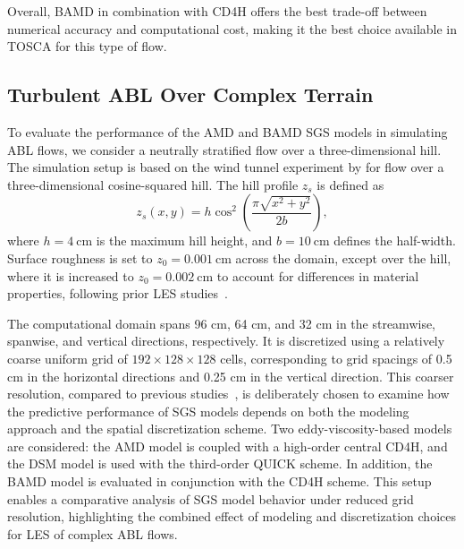 \documentclass[final,3p]{elsarticle}
\begin{document}
Overall, BAMD in combination with CD4H offers the best trade-off between numerical accuracy and computational cost, making it the best choice available in TOSCA for this type of flow.

\subsection{Turbulent ABL Over Complex Terrain}
To evaluate the performance of the AMD and BAMD SGS models in simulating ABL flows, we consider a neutrally stratified flow over a three-dimensional hill. The simulation setup is based on the wind tunnel experiment by \citet{ishihara1999wind} for flow over a three-dimensional cosine-squared hill. The hill profile \( z_s \) is defined as
\begin{equation}
    z_s(x,y) = h \cos^2 \left(\frac{\pi \sqrt{x^2 + y^2}}{2 b}\right),
\label{eq:hillshape}
\end{equation}
where \( h = 4~\mathrm{cm} \) is the maximum hill height, and \( b = 10~\mathrm{cm} \) defines the half-width. Surface roughness is set to \( z_0 = 0.001~\mathrm{cm} \) across the domain, except over the hill, where it is increased to \( z_0 = 0.002~\mathrm{cm} \) to account for differences in material properties, following prior LES studies~\cite{fang2016intercomparison,liu2020wall}.

The computational domain spans 96 cm, 64 cm, and 32 cm in the streamwise, spanwise, and vertical directions, respectively. It is discretized using a relatively coarse uniform grid of \( 192 \times 128 \times 128 \) cells, corresponding to grid spacings of 0.5 cm in the horizontal directions and 0.25 cm in the vertical direction. This coarser resolution, compared to previous studies~\cite{liu2020wall}, is deliberately chosen to examine how the predictive performance of SGS models depends on both the modeling approach and the spatial discretization scheme. Two eddy-viscosity-based models are considered: the AMD model is coupled with a high-order central CD4H, and the DSM model is used with the third-order QUICK scheme. In addition, the BAMD model is evaluated in conjunction with the CD4H scheme. This setup enables a comparative analysis of SGS model behavior under reduced grid resolution,  highlighting the combined effect of modeling and discretization choices for LES of complex ABL flows.
\end{document}
